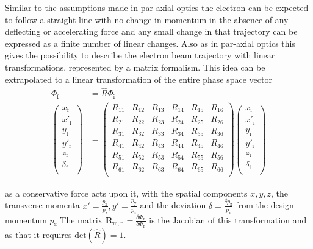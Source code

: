Similar to the assumptions made in par-axial optics the electron can be expected to 
follow a straight line with no change in momentum in the absence of any deflecting or accelerating force and any small change in that trajectory 
can be expressed as a finite number of linear changes. 
Also as in par-axial optics this gives the possibility to describe the electron beam trajectory with linear transformations, represented by a matrix formalism.
This idea can be extrapolated to a linear transformation of the entire phase space vector 
\begin{equation}
\label{eqn:R_Matrix}
\begin{split}
\Phi_\mathrm{f}&=\hat{R} \Phi_\mathrm{i} \\
\begin{pmatrix}
x_\mathrm{f}\\
x'_\mathrm{f}\\
y_\mathrm{f}\\
y'_\mathrm{f}\\
z_\mathrm{f}\\
\delta_\mathrm{f}\\
\end{pmatrix}
&=
\begin{pmatrix}
R_{11}&R_{12}&R_{13}&R_{14}&R_{15}&R_{16}\\
R_{21}&R_{22}&R_{23}&R_{24}&R_{25}&R_{26}\\
R_{31}&R_{32}&R_{33}&R_{34}&R_{35}&R_{36}\\
R_{41}&R_{42}&R_{43}&R_{44}&R_{45}&R_{46}\\
R_{51}&R_{52}&R_{53}&R_{54}&R_{55}&R_{56}\\
R_{61}&R_{62}&R_{63}&R_{64}&R_{65}&R_{66}\\
\end{pmatrix}
\begin{pmatrix}
x_\mathrm{i}\\
x'_\mathrm{i}\\
y_\mathrm{i}\\
y'_\mathrm{i}\\
z_\mathrm{i}\\
\delta_\mathrm{i}\\
\end{pmatrix}
\end{split}
\end{equation}

as a conservative force acts upon it, with the spatial components $x,y,z$, the transverse momenta $x'=\frac{p_\mathrm{x}}{p_\mathrm{z}},y'=\frac{p_\mathrm{y}}{p_\mathrm{z}}$ and the deviation  $\delta=\frac{\delta p_\mathrm{z}}{p_\mathrm{z}}$ from the design momentum $p_\mathrm{z}$
The matrix $\mathbf{R}_\mathrm{m,n}= \frac{\delta \Phi_\mathrm{n}}{\delta \Phi_\mathrm{n}}$ is the Jacobian of this transformation and as that it requires $\mathrm{det}(\hat{R})=1$.

